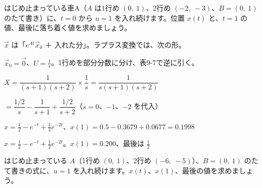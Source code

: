 \begin{reidai}[一定の力を入れる]
はじめ止まっている車A（$A$ は1行め $(0,\ 1)$、2行め $(-2,\ -3)$、$B=(0,\ 1)$ のたて書き）に、$t=0$ から $u=1$ を入れ続けます。位置 $x(t)$ と、$t=1$ の値、最後に落ち着く値を求めましょう。\par
\kangaekata {}\par
{}\enspace $\vec x$ は「$e^{At}\vec x_0$ ＋ 入れた分」。ラプラス変換では、次の形。\par
{}
\enspace $\vec x_0=\vec0$、$U=\frac1s$。1行めを部分分数に分け、表9-7で逆に引く。\par
\shiki\kixls{}\zw{} $X=\dfrac{1}{(s+1)(s+2)}\times\dfrac1s=\dfrac{1}{s(s+1)(s+2)}$\par
\kixla $=\dfrac{1/2}{s}-\dfrac{1}{s+1}+\dfrac{1/2}{s+2}$\quad （$s=0$、$-1$、$-2$ を代入）\par
\kixla $x=\frac12-e^{-t}+\frac12e^{-2t}$、$x(1)=0.5-0.3679+0.0677=0.1998$\par
\kotae $x=\frac12-e^{-t}+\frac12e^{-2t}$。$x(1)=0.200$、最後は $\frac12$
\end{reidai}

\begin{jibun}
はじめ止まっている $A$（1行め $(0,\ 1)$、2行め $(-6,\ -5)$）、$B=(0,\ 1)$ のたて書きの式に、$u=1$ を入れ続けます。$x(t)$、$x(1)$、最後の値を求めましょう。
\end{jibun}

